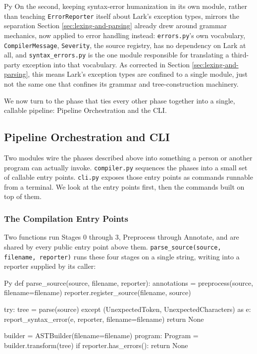 \begin{codeblock}[]{Py}
On the second, keeping syntax-error humanization in its own module, rather than teaching \lstinline|ErrorReporter| itself about Lark's exception types, mirrors the separation Section \ref{sec:lexing-and-parsing} already drew around grammar mechanics, now applied to error handling instead: \lstinline|errors.py|'s own vocabulary, \lstinline|CompilerMessage|, \lstinline|Severity|, the source registry, has no dependency on Lark at all, and \lstinline|syntax_errors.py| is the one module responsible for translating a third-party exception into that vocabulary. As corrected in Section \ref{sec:lexing-and-parsing}, this means Lark's exception types are confined to a single module, just not the same one that confines its grammar and tree-construction machinery.

We now turn to the phase that ties every other phase together into a single, callable pipeline: Pipeline Orchestration and the CLI.

\subsection{Pipeline Orchestration and CLI}
\label{sec:orchestration}
Two modules wire the phases described above into something a person or another program can actually invoke. \lstinline|compiler.py| sequences the phases into a small set of callable entry points. \lstinline|cli.py| exposes those entry points as commands runnable from a terminal. We look at the entry points first, then the commands built on top of them.

\subsubsection{The Compilation Entry Points}
Two functions run Stages 0 through 3, Preprocess through Annotate, and are shared by every public entry point above them. \lstinline|parse_source(source, filename, reporter)| runs these four stages on a single string, writing into a reporter supplied by its caller:
\begin{codeblock}[]{Py}
def parse_source(source, filename, reporter):
    annotations = preprocess(source, filename=filename)
    reporter.register_source(filename, source)

    try:
        tree = parse(source)
    except (UnexpectedToken, UnexpectedCharacters) as e:
        report_syntax_error(e, reporter, filename=filename)
        return None

    builder = ASTBuilder(filename=filename)
    program: Program = builder.transform(tree)
    if reporter.has_errors():
        return None


\end{codeblock}
\end{codeblock}
